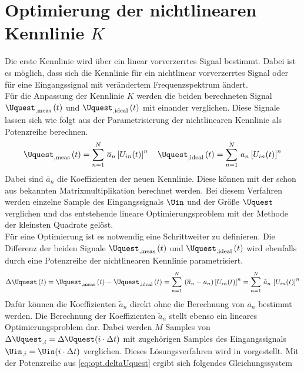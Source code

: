 \documentclass[../Report.tex]{subfiles}
\begin{document}
\section{Optimierung der nichtlinearen Kennlinie $K$}
\label{sec:opt.K}
Die erste Kennlinie wird über ein linear vorverzerrtes Signal bestimmt. Dabei ist es möglich, dass sich die Kennlinie für ein nichtlinear vorverzerrtes Signal oder für eine Eingangssignal mit verändertem Frequenzspektrum ändert. \\
Für die Anpassung der Kennlinie $K$ werden die beiden berechneten Signal $\Uquest_{, \mathrm{meas}} \oft$ und $\Uquest_{, \mathrm{ideal}} \oft$ mit einander verglichen. Diese Signale lassen sich wie folgt aus der Parametrisierung der nichtlinearen Kennlinie als Potenzreihe berechnen.
\begin{align}
	\Uquest_{, \mathrm{meas}} \oft = \sum_{n=1}^N \, \overline{a}_n \left[ U_{in}(t) \right]^n
	\quad
	\Uquest_{, \mathrm{ideal}} \oft = \sum_{n=1}^N \, a_n \left[ U_{in}(t) \right]^n
\end{align}
Dabei sind $\overline{a}_n$ die Koeffizienten der neuen Kennlinie. Diese können mit der schon aus \cite{harzheim} bekannten Matrixmultiplikation berechnet werden. Bei diesem Verfahren werden einzelne Sample des Eingangssignals $\Uin$ und der Größe $\Uquest$ verglichen und das entstehende lineare Optimierungsproblem mit der Methode der kleinsten Quadrate gelöst. \\
Für eine Optimierung ist es notwendig eine Schrittweiter zu definieren. Die Differenz der beiden Signale $\Uquest_{, \mathrm{meas}} \oft$ und $\Uquest_{, \mathrm{ideal}} \oft$ wird ebenfalls durch eine Potenzreihe der nichtlinearen Kennlinie parametrisiert.
\begin{align}
\label{eq:opt.deltaUquest}
	\Delta \Uquest \oft = \Uquest_{, \mathrm{meas}} \oft - \Uquest_{, \mathrm{ideal}} \oft
	=
	\sum_{n=1}^N \, \left( \overline{a}_n -  a_n\right) \left[ U_{in}(t) \right]^n
	=
	\sum_{n=1}^N \, \tilde{a}_n \, \left[ U_{in}(t) \right]^n	
\end{align}
Dafür können die Koeffizienten $\tilde{a}_n$ direkt ohne die Berechnung von $\overline{a}_n$ bestimmt werden. Die Berechnung der Koeffizienten $\tilde{a}_n$ stellt ebenso ein lineares Optimierungsproblem dar. Dabei werden $M$ Samples von ${\Delta \Uquest_{,i} = \Delta \Uquest (i \cdot \Delta t)}$ mit zugehörigen Samples des Eingangssignals ${\Uin_{,i} = \Uin (i \cdot \Delta t)}$ verglichen. Dieses Lösungsverfahren wird in \cite{harzheim} vorgestellt. Mit der Potenzreihe aus \eqref{eq:opt.deltaUquest} ergibt sich folgendes Gleichungssystem
\end{document}
